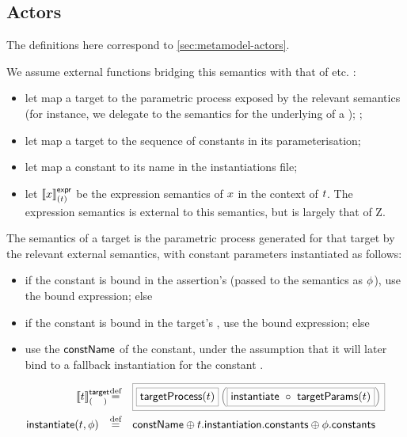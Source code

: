 \subsection{Actors}\label{ssec:semantics-tockcsp-actors}

The definitions here correspond to \cref{sec:metamodel-actors}.

We assume external functions bridging this semantics with that of
\robochart{} etc. :

\begin{itemize}
\item
	let  map a target to the parametric
	process exposed by the relevant \tockcsp{} semantics (for instance,
	we delegate to the \robochart{} semantics for the underlying
	\mrcmodule{} of a \mrcmoduletarget);
	;
\item
	let  map a target to the sequence of
	constants in its parameterisation;
\item
	let  map a constant to its name in the \robochart{}
	instantiations file;
\item
	let \(\llbracket x \rrbracket^{\mathsf{expr}}_{(t)}\) be the expression semantics of 
	\(x\) in the context of \(t\).  The expression semantics
	is external to this semantics, but is largely that of Z.
\end{itemize}

\begin{defn}[\mtarget]

The semantics of a target is the parametric process generated for that
target by the relevant external semantics, with constant parameters instantiated
as follows:

\begin{itemize}
\item
	if the constant is bound in the assertion's \mtargetinstantiation{}
	(passed to the semantics as \(\phi\)), use the bound expression; else
\item
	if the constant is bound in the target's \mtargetinstantiation, use
	the bound expression; else
\item
	use the \(\mathsf{constName}\) of the constant, under the assumption
	that it will later bind to a fallback instantiation for the constant
	.
\end{itemize}
%
\begin{align*}
	\targetsema{\atarget}
\quad\defeq\quad&
\tlang{
	\olang{\funcname{targetProcess}(\atarget)}
	\left(
		\olang{\funcname{instantiate}\ \circ\ \funcname{targetParams}(\atarget)}
	\right)
}
\\
	\funcname{instantiate}(\atarget, \aninst)
\quad\defeq\quad&
	\funcname{constName}
	\oplus
	\field{\field{\atarget}{instantiation}}{constants}
	\oplus
	\field{\aninst}{constants}
\end{align*}
\end{defn}

